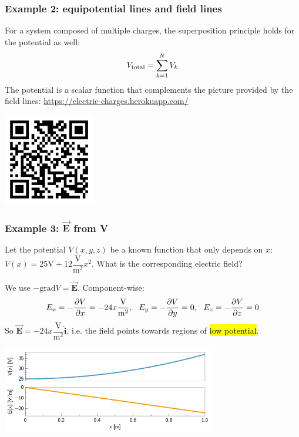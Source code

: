\documentclass{beamer}
\makeatletter
\newcommand{\vc}[1]{\vec{\boldsymbol{#1}}}
\newcommand{\hi}{\hat{\boldsymbol{i}}}
\let\HL\hl
\renewcommand\hl{%
  \let\set@color\beamerorig@set@color
  \let\reset@color\beamerorig@reset@color
  \HL}
\makeatother
\begin{document}
\begin{frame}
	\frametitle{Example 2: equipotential lines and field lines}
	
	For a system composed of multiple charges, the superposition principle holds for the potential as well:
	\begin{equation}
		V_{\rm total} =\sum_{k=1}^N V_k
	\end{equation}
	The potential is a scalar function that complements the picture provided by the field lines:\newline
	{\color{UniversityRed}\href{https://electric-charges.herokuapp.com/}{https://electric-charges.herokuapp.com/}}
	
	\includegraphics[width=0.3\textwidth]{figs/qr-code}
	
	
	\end{frame}
	
\begin{frame}
\frametitle{Example 3: $\vc{E}$ from V}
\small 
Let the potential $V(x,y,z) $ be a known function that only depends on $x$:
$V(x) = 25 \unit{\volt}+12 \dfrac{\unit{\volt}}{\unit{\meter^2}} x^2$.  What is the corresponding electric field?\newline \pause

We use $-\text{grad}V=\vc{E}$. Component-wise:
$$\tiny E_x = -\dfrac{\partial V}{\partial x}= -24 x \dfrac{\unit{\volt}}{\unit{\meter^2}}, \quad E_y= -\dfrac{\partial V}{\partial y}=0,\quad E_z = -\dfrac{\partial V}{\partial z}=0$$
So $\vc{E}= -24 x \dfrac{\unit{\volt}}{\unit{\meter^2}} \hi $, i.e. the field points towards regions of \hl{low potential}.


\begin{center}
	\includegraphics[width=0.7\textwidth]{figs/pot1d.pdf}
\end{center}

\end{frame}
\end{document}
